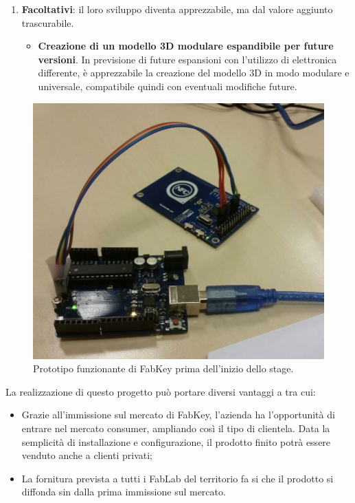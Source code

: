 \begin{enumerate}
\medskip

\item \textbf{Facoltativi}: il loro sviluppo diventa apprezzabile, ma dal valore aggiunto trascurabile.
\begin{itemize}
\item \textbf{Creazione di un modello 3D modulare espandibile per future versioni}. In previsione di future espansioni con l'utilizzo di elettronica differente, è apprezzabile la creazione del modello 3D in modo modulare e universale, compatibile quindi con eventuali modifiche future. 
\end{itemize}
\end{enumerate}

\begin{figure}[H]
	\begin{center}
	\includegraphics[scale=0.25]{immagini/fabkey_prima.jpg}
	\caption{Prototipo funzionante di FabKey prima dell'inizio dello stage.}
	\end{center}
\end{figure}

La realizzazione di questo progetto può portare diversi vantaggi a \lab{} tra cui:

\begin{itemize}
\item Grazie all'immissione sul mercato di FabKey, l'azienda ha l'opportunità di entrare nel mercato consumer, ampliando così il tipo di clientela. Data la semplicità di installazione e configurazione, il prodotto finito potrà essere venduto anche a clienti privati;

\item La fornitura prevista a tutti i FabLab del territorio fa si che il prodotto si diffonda sin dalla prima immissione sul mercato.
\end{itemize}

